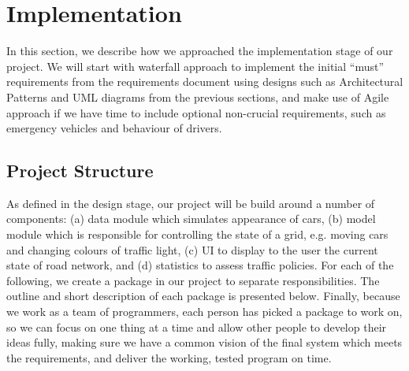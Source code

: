 \documentclass{article}
\begin{document}

\section{Implementation}
	In this section, we describe how we approached the implementation stage of our project. 
	We will start with waterfall approach to implement the initial “must” requirements from the requirements document using designs such as Architectural Patterns and UML diagrams from the previous sections, and make use of Agile approach if we have time to include optional non-crucial requirements, such as emergency vehicles and behaviour of drivers. 
	
	
	\subsection{Project Structure}
	As defined in the design stage, our project will be build around a number of components: (a) data module which simulates appearance of cars, (b) model module which is responsible for controlling the state of a grid, e.g. moving cars and changing colours of traffic light, (c) UI to display to the user the current state of road network, and (d) statistics to assess traffic policies. 
	For each of the following, we create a package in our project to separate responsibilities. 
	The outline and short description of each package is presented below. Finally, because we work as a team of programmers, each person has picked a package to work on, so we can focus on one thing at a time and allow other people to develop their ideas fully, making sure we have a common vision of the final system which meets the requirements, and deliver the working, tested program on time. 
	
\end{document}

